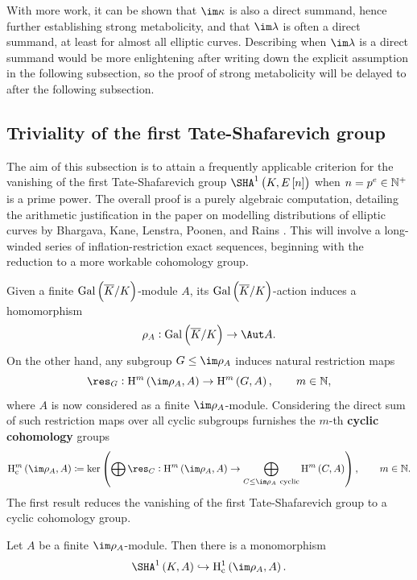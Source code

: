 With more work, it can be shown that $ \im \kappa $ is also a direct summand, hence further establishing strong metabolicity, and that $ \im \lambda $ is often a direct summand, at least for almost all elliptic curves. Describing when $ \im \lambda $ is a direct summand would be more enlightening after writing down the explicit assumption in the following subsection, so the proof of strong metabolicity will be delayed to after the following subsection.

\pagebreak

\subsection{Triviality of the first Tate-Shafarevich group}

The aim of this subsection is to attain a frequently applicable criterion for the vanishing of the first Tate-Shafarevich group $ \Sha[K, E\sbr{n}] $ when $ n = p^e \in \mathbb{N}^+ $ is a prime power. The overall proof is a purely algebraic computation, detailing the arithmetic justification in the paper on modelling distributions of elliptic curves by Bhargava, Kane, Lenstra, Poonen, and Rains \cite{BKLPR15}. This will involve a long-winded series of inflation-restriction exact sequences, beginning with the reduction to a more workable cohomology group.

Given a finite $ \AG{K} $-module $ A $, its $ \AG{K} $-action induces a homomorphism
$$ \rho_A : \AG{K} \to \Aut A. $$
On the other hand, any subgroup $ G \le \im \rho_A $ induces natural restriction maps
$$ \res_G : \H^m\br{\im \rho_A, A} \to \H^m\br{G, A}, \qquad m \in \NN, $$
where $ A $ is now considered as a finite $ \im \rho_A $-module. Considering the direct sum of such restriction maps over all cyclic subgroups furnishes the $ m $-th \textbf{cyclic cohomology} groups
$$ \H_\c^m\br{\im \rho_A, A} \coloneqq \ker \br{\bigoplus \res_C : \H^m\br{\im \rho_A, A} \to \bigoplus_{C \le \im \rho_A \ \text{cyclic}} \H^m\br{C, A}}, \qquad m \in \NN. $$
The first result reduces the vanishing of the first Tate-Shafarevich group to a cyclic cohomology group.

\begin{lemma}
\label{lem:cyclicimage}
Let $ A $ be a finite $ \im \rho_A $-module. Then there is a monomorphism
$$ \Sha[K, A] \hookrightarrow \H_\c^1\br{\im \rho_A, A}. $$
\end{lemma}

